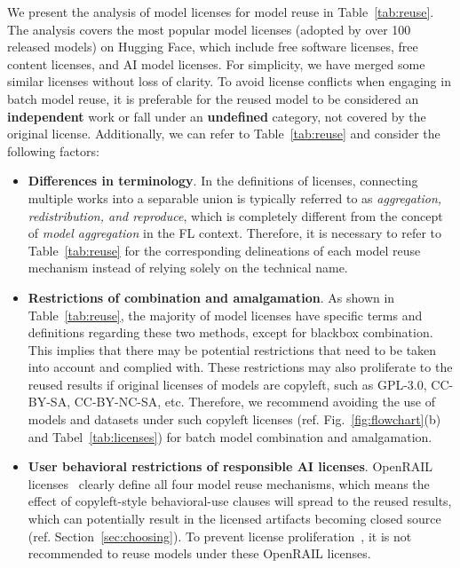 We present the analysis of model licenses for model reuse in Table~\ref{tab:reuse}. 
The analysis covers the most popular model licenses (adopted by over 100 released models) on Hugging Face, which include free software licenses, free content licenses, and AI model licenses.
For simplicity, we have merged some similar licenses without loss of clarity.
To avoid license conflicts when engaging in batch model reuse, it is preferable for the reused model to be considered an \textbf{independent} work or fall under an \textbf{undefined} category, not covered by the original license.
Additionally, we can refer to Table~\ref{tab:reuse} and consider the following factors:
\begin{itemize}
  \item \textbf{Differences in terminology}. In the definitions of licenses, connecting multiple works into a separable union is typically referred to as \textit{aggregation, redistribution, and reproduce}, which is completely different from the concept of \textit{model aggregation} in the FL context. Therefore, it is necessary to refer to Table~\ref{tab:reuse} for the corresponding delineations of each model reuse mechanism instead of relying solely on the technical name.

  \item \textbf{Restrictions of combination and amalgamation}. As shown in Table~\ref{tab:reuse}, the majority of model licenses have specific terms and definitions regarding these two methods, except for blackbox combination. This implies that there may be potential restrictions that need to be taken into account and complied with.
  These restrictions may also proliferate to the reused results if original licenses of models are copyleft, such as GPL-3.0, CC-BY-SA, CC-BY-NC-SA, etc.
  Therefore, we recommend avoiding the use of models and datasets under such copyleft licenses (ref. Fig.~\ref{fig:flowchart}(b) and Tabel~\ref{tab:licenses}) for batch model combination and amalgamation.

  \item \textbf{User behavioral restrictions of responsible AI licenses}. OpenRAIL licenses~\cite{contractor2022behavioral} clearly define all four model reuse mechanisms, which means the effect of copyleft-style behavioral-use clauses will spread to the reused results, which can potentially result in the licensed artifacts becoming closed source~\cite{greenbaum2016the} (ref. Section~\ref{sec:choosing}).
  To prevent license proliferation~\cite{gomulkiewicz2009open}, it is not recommended to reuse models under these OpenRAIL licenses.
\end{itemize}

